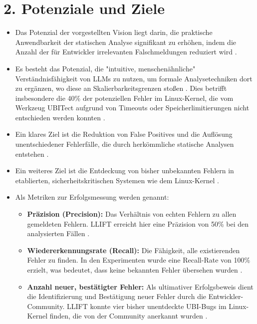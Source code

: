 \documentclass{article}
\begin{document}
\section*{2. Potenziale und Ziele}
\begin{itemize}
    \item Das Potenzial der vorgestellten Vision liegt darin, die praktische Anwendbarkeit der statischen Analyse signifikant zu erhöhen, indem die Anzahl der für Entwickler irrelevanten Falschmeldungen reduziert wird \cite{Li2024}.
    \item Es besteht das Potenzial, die "intuitive, menschenähnliche" Verständnisfähigkeit von LLMs zu nutzen, um formale Analysetechniken dort zu ergänzen, wo diese an Skalierbarkeitsgrenzen stoßen \cite{Li2024}. Dies betrifft insbesondere die 40\% der potenziellen Fehler im Linux-Kernel, die vom Werkzeug UBITect aufgrund von Timeouts oder Speicherlimitierungen nicht entschieden werden konnten \cite{Li2024}.
    \item Ein klares Ziel ist die Reduktion von False Positives und die Auflösung unentschiedener Fehlerfälle, die durch herkömmliche statische Analysen entstehen \cite{Li2024}.
    \item Ein weiteres Ziel ist die Entdeckung von bisher unbekannten Fehlern in etablierten, sicherheitskritischen Systemen wie dem Linux-Kernel \cite{Li2024}.
    \item Als Metriken zur Erfolgsmessung werden genannt:
        \begin{itemize}
            \item \textbf{Präzision (Precision):} Das Verhältnis von echten Fehlern zu allen gemeldeten Fehlern. LLIFT erreicht hier eine Präzision von 50\% bei den analysierten Fällen \cite{Li2024}.
            \item \textbf{Wiedererkennungsrate (Recall):} Die Fähigkeit, alle existierenden Fehler zu finden. In den Experimenten wurde eine Recall-Rate von 100\% erzielt, was bedeutet, dass keine bekannten Fehler übersehen wurden \cite{Li2024}.
            \item \textbf{Anzahl neuer, bestätigter Fehler:} Als ultimativer Erfolgsbeweis dient die Identifizierung und Bestätigung neuer Fehler durch die Entwickler-Community. LLIFT konnte vier bisher unentdeckte UBI-Bugs im Linux-Kernel finden, die von der Community anerkannt wurden \cite{Li2024}.
        \end{itemize}
\end{itemize}
\end{document}
